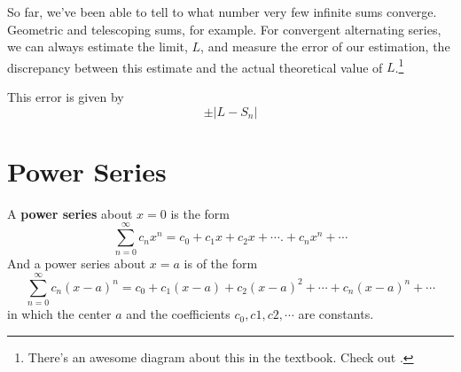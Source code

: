 So far, we've been able to tell to what number very few infinite sums converge.
Geometric and telescoping sums, for example. For convergent alternating series,
we can always estimate the limit, $L$, and measure the error of our estimation,
the discrepancy between this estimate and the actual theoretical value of
$L$.\footnote{There's an awesome diagram about this in the textbook. Check out
  \cite[p.~569 Fig.~10.13]{thomas}.}

This error is given by
\begin{equation}
  \pm | L - S_n |
\end{equation}

%
\section{Power Series}
A \textbf{power series} about $x=0$ is the form
\[ \sum_{n=0}^\infty c_n x^n = c_0 + c_1 x + c_2 x + \cdots. + c_n x^n + \cdots
  \]
  And a power series about $x=a$ is of the form
  \begin{equation}\label{eq:powerxa} \sum_{n=0}^\infty c_n (x-a)^n = c_0 + c_1 (x-a) + c_2 (x-a)^2 +
    \cdots + c_n (x-a)^n + \cdots \end{equation}
    in which the center $a$ and the coefficients $c_0, c1, c2, \cdots$ are
    constants.

